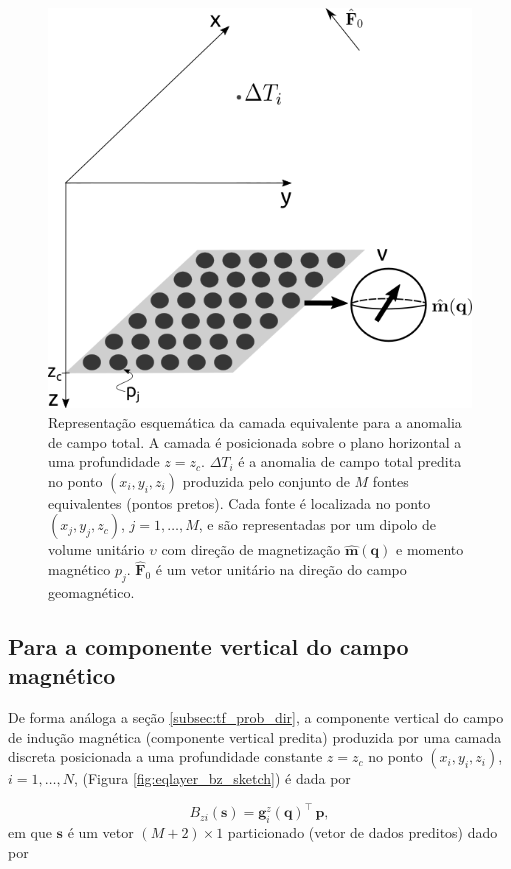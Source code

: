 
\begin{figure}[H]
	\centering
	\includegraphics[width=.7\textwidth]{Fig/eqlayer/eqlayer_figure_tfa.png}
	\caption{Representação esquemática da camada equivalente para a anomalia de campo total. A camada é posicionada sobre o plano horizontal a uma profundidade $z=z_c$. $\Delta T_i$ é a anomalia de campo total predita no ponto $(x_i,y_i,z_i)$ produzida pelo conjunto de $M$ fontes equivalentes (pontos pretos). Cada fonte é localizada no ponto  $(x_j,y_j,z_c)$, $j = 1,\hdots, M$, e são representadas por um dipolo de volume unitário $\upsilon$ com direção de magnetização $\hat{\mathbf{m}}(\mathbf{q})$ e momento magnético $p_j$. $\hat{\mathbf{F}}_{0}$ é um vetor unitário na direção do campo geomagnético.}
	\label{fig:eqlayer_tfa_sketch}
\end{figure}

\subsection{Para a componente vertical do campo magnético}
\label{subsec:bz_prob_dir}

De forma análoga a seção \ref{subsec:tf_prob_dir}, a componente vertical do campo de indução magnética (componente vertical predita) produzida por uma camada discreta posicionada a uma profundidade constante $z=z_c$ no ponto $(x_i,y_i,z_i)$, $i=1,\dots,N$, (Figura \ref{fig:eqlayer_bz_sketch}) é dada por 

\begin{equation}
B_{zi} (\mathbf{s})  = \mathbf{g}_{i}^{z}(\mathbf{q})^{\top} \, \mathbf{p},
\label{eq:pred_data_ith-z}
\end{equation}
em que $\mathbf{s}$ é um vetor $(M + 2) \times 1$ particionado (vetor de dados preditos) dado por 


